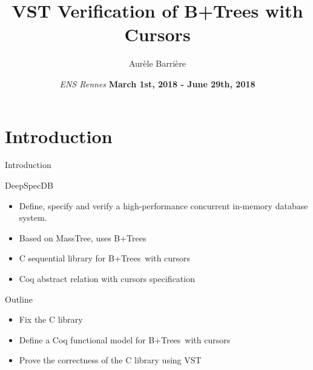 \documentclass[page number,usenames,dvipsnames]{beamer}
\def\outline{
  \begin{frame}[plain,noframenumbering]
    \frametitle{Outline}
    \tableofcontents[currentsection]
  \end{frame}
}
\def\btrees{B+Trees}
\begin{document}
\title[shorttitle]{VST Verification of B+Trees with Cursors}

\author[Aur\`ele Barri\`ere]{Aur\`ele Barri\`ere}

\date{\textit{ENS Rennes}
  \vfill
  \textbf{March 1st, 2018 - June 29th, 2018}}

\def\outline{
  \begin{frame}[plain,noframenumbering]
    \frametitle{Outline}
    \tableofcontents[currentsection]
  \end{frame}
}



\begin{frame}
  \vspace{-2cm}
  \maketitle
  \vspace{-4cm}
\end{frame}



\section{Introduction}
\begin{frame}{Introduction}
  \begin{block}{DeepSpecDB}
    \begin{itemize}
    \item Define, specify and verify a high-performance {\color{mDarkRed}concurrent} in-memory database system.
    \item Based on MassTree, uses \btrees
    \item C sequential library for \btrees\ with cursors
    \item Coq abstract relation with cursors specification
    \end{itemize}
  \end{block}
  \vfill
  \begin{exampleblock}{Outline}
    \begin{itemize}
    \item Fix the C library
    \item Define a Coq functional model for \btrees\ with cursors
    \item Prove the correctness of the C library using VST
    \end{itemize}
  \end{exampleblock}
      
\end{frame}
\end{document}
